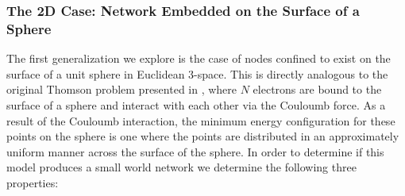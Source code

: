 \documentclass[aps,pre,reprint,superscriptaddress,amsmath,amssymb]{revtex4-1}
\begin{document}
\subsubsection{The 2D Case: Network Embedded on the Surface of a Sphere}
The first generalization we explore is the case of nodes confined to exist on the surface of a unit sphere in Euclidean 3-space.
This is directly analogous to the original Thomson problem presented in \cite{thomson1904}, where $N$ electrons are bound to the surface of a sphere and interact with each other via the Couloumb force.
As a result of the Couloumb interaction, the minimum energy configuration for these points on the sphere is one where the points are distributed in an approximately uniform manner across the surface of the sphere.
In order to determine if this model produces a small world network we determine the following three properties:
\end{document}
